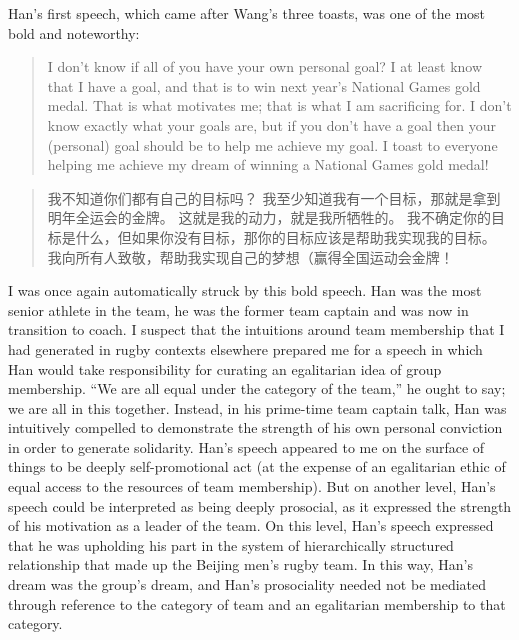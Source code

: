 \begin{CJK}{UTF8}{gbsn}
Han's first speech, which came after Wang's three toasts, was one of the most bold and noteworthy:

  \begin{quotation}
    I don’t know if all of you have your own personal goal?  I at least know that I have a goal, and that is to win next year’s National Games gold medal.  That is what motivates me; that is what I am sacrificing for.  I don’t know exactly what your goals are, but if you don't have a goal then your (personal) goal should be to help me achieve my goal.  I toast to everyone helping me achieve my dream of winning a National Games gold medal!
  \end{quotation}

  \begin{quotation}
      我不知道你们都有自己的目标吗？ 我至少知道我有一个目标，那就是拿到明年全运会的金牌。 这就是我的动力，就是我所牺牲的。 我不确定你的目标是什么，但如果你没有目标，那你的目标应该是帮助我实现我的目标。 我向所有人致敬，帮助我实现自己的梦想（赢得全国运动会金牌！
  \end{quotation}

I was once again automatically struck by this bold speech.  Han was the most senior athlete in the team, he was the former team captain and was now in transition to coach.  I suspect that the intuitions around team membership that I had generated in rugby contexts elsewhere prepared me for a speech in which Han would take responsibility for curating an egalitarian idea of group membership.  ``We are all equal under the category of the team,'' he ought to say; we are all in this together.   Instead, in his prime-time team captain talk, Han was intuitively compelled to demonstrate the strength of his own personal conviction in order to generate solidarity. Han's speech appeared to me on the surface of things to be deeply self-promotional act (at the expense of an egalitarian ethic of equal access to the resources of team membership). But on another level, Han's speech could be interpreted as being deeply prosocial, as it expressed the strength of his motivation as a leader of the team. On this level, Han's speech expressed that he was upholding his part in the system of hierarchically structured relationship that made up the Beijing men's rugby team.  In this way, Han's dream was the group's dream, and Han's prosociality needed not be mediated through reference to the category of team and an egalitarian membership to that category.


\end{CJK}
